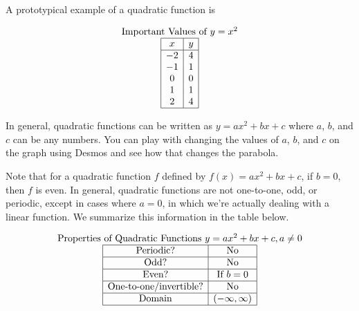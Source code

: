 \documentclass[nooutcomes]{ximera}
\begin{document}
\begin{example}
A prototypical example of a quadratic function is 

\begin{center}
\end{center}

\begin{center}
\end{center}

\[
\begin{array}{c  }
\text{\normalfont Important Values of $y=x^2$} \\
 \begin{array}{|c|c|}
 \hline
 x & y\\
 \hline
 -2&4\\
 -1&1\\
 0&0\\
 1&1\\
 2&4\\
 \hline
\end{array}
\end{array}
\]
\end{example}

In general, quadratic functions can be written as $y=ax^2+bx+c$ where $a$, $b$, and $c$ can be any numbers.  You can play with changing the values of $a$, $b$, and $c$ on the graph using Desmos and see how that changes the parabola.  

\begin{center}  
\end{center}

Note that for a quadratic function $f$ defined by $f(x) = ax^2 + bx + c$, if $b = 0$, then $f$ is even. In general, quadratic functions are not one-to-one, odd, or periodic, except in cases where $a = 0$, in which we're actually dealing with a linear function. We summarize this information in the table below.

\[
\begin{array}{  c  }
\text{\normalfont Properties of Quadratic Functions } y=ax^2 + bx + c, a \ne 0 \\
 \begin{array}{|c|c|}
 \hline
\text{Periodic?} & \text{No} \\ \hline
\text{Odd?} & \text{No} \\ \hline
\text{Even?} & \text{If } b = 0 \\ \hline
\text{One-to-one/invertible?} & \text{No}\\ \hline
\text{Domain} & (-\infty,\infty)\\ \hline
\end{array}
\end{array}
\]
\end{document}
